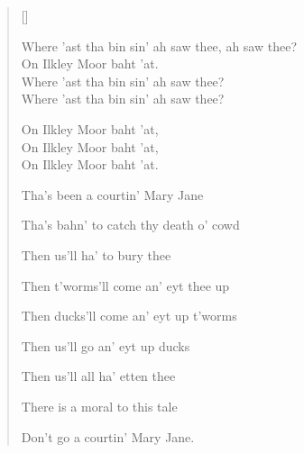 \pagebreak
\settowidth{\versewidth}{Then t'worms'll come an' eyt thee up}
\begin{verse}[\versewidth]

\begin{patverse}
Where 'ast tha bin sin' ah saw thee, ah saw thee?\\
On Ilkley Moor baht 'at.\\
Where 'ast tha bin sin' ah saw thee?\\
Where 'ast tha bin sin' ah saw thee?\\
\end{patverse}

\begin{chorus}
On Ilkley Moor baht 'at,\\
On Ilkley Moor baht 'at,\\
On Ilkley Moor baht 'at.
\end{chorus}

Tha's been a courtin' Mary Jane

Tha's bahn' to catch thy death o' cowd

Then us'll ha' to bury thee

Then t'worms'll come an' eyt thee up

Then ducks'll come an' eyt up t'worms

Then us'll go an' eyt up ducks

Then us'll all ha' etten thee

There is a moral to this tale

Don't go a courtin' Mary Jane.
\end{verse}

